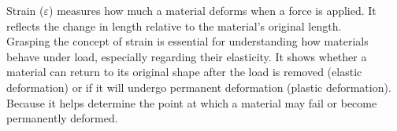 \documentclass{article}
\begin{document}
        Strain ($\varepsilon$) measures how much a material deforms when a force is applied. It reflects the change in length relative to the material's original length.\\[8pt]
        Grasping the concept of strain is essential for understanding how materials behave under load, especially regarding their elasticity. It shows whether a material can return to its original shape after the load is removed (elastic deformation) or if it will undergo permanent deformation (plastic deformation). Because it helps determine the point at which a material may fail or become permanently deformed.\\
        \newpage
\end{document}
